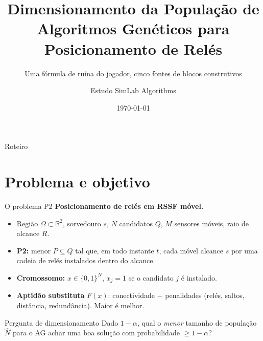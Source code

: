 \documentclass[aspectratio=169]{beamer}
\title[Dimensionamento de População em AGs]{Dimensionamento da População de
Algoritmos Genéticos para Posicionamento de Relés}
\subtitle{Uma fórmula de ruína do jogador, cinco fontes de blocos construtivos}
\author{Estudo SimLab Algorithms}
\institute{Otimização de Redes de Sensores sem Fio --- \texttt{simlab-algorithms}}
\date{\today}
\newcommand{\Nhat}{\hat{N}}
\begin{document}
\begin{frame}\titlepage\end{frame}

\begin{frame}{Roteiro}\tableofcontents\end{frame}

\section{Problema e objetivo}
\begin{frame}{O problema P2}
\textbf{Posicionamento de relés em RSSF móvel.}
\begin{itemize}
  \item Região $\Omega\subset\mathbb{R}^2$, sorvedouro $s$, $N$ candidatos $Q$,
        $M$ sensores móveis, raio de alcance $R$.
  \item \textbf{P2:} menor $P\subseteq Q$ tal que, em todo instante $t$, cada móvel
        alcance $s$ por uma cadeia de relés instalados dentro do alcance.
  \item \textbf{Cromossomo:} $x\in\{0,1\}^N$, $x_j=1$ se o candidato $j$ é instalado.
  \item \textbf{Aptidão substituta} $F(x)$: conectividade $-$ penalidades (relés,
        saltos, distância, redundância). Maior é melhor.
\end{itemize}
\vfill
\begin{block}{Pergunta de dimensionamento}
Dado $1-\alpha$, qual o \emph{menor} tamanho de população $\Nhat$ para o AG achar
uma boa solução com probabilidade $\ge 1-\alpha$?
\end{block}
\end{frame}

\end{document}
